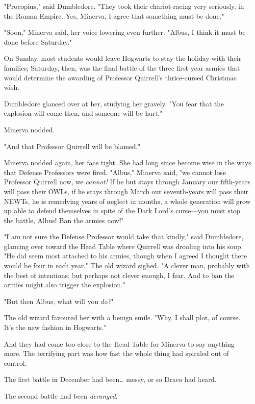 "Procopius," said Dumbledore. "They took their chariot-racing very seriously,
in the Roman Empire. Yes, Minerva, I agree that something must be done."

"Soon," Minerva said, her voice lowering even further. "Albus, I think it must
be done before Saturday."

On Sunday, most students would leave Hogwarts to stay the holiday with their
families; Saturday, then, was the final battle of the three first-year armies
that would determine the awarding of Professor Quirrell's thrice-cursed
Christmas wish.

Dumbledore glanced over at her, studying her gravely. "You fear that the
explosion will come then, and someone will be hurt."

Minerva nodded.

"And that Professor Quirrell will be blamed."

Minerva nodded again, her face tight. She had long since become wise in the
ways that Defense Professors were fired. "Albus," Minerva said, "we cannot lose
Professor Quirrell now, we \emph{cannot!} If he but stays through January our
fifth-years will pass their OWLs, if he stays through March our seventh-years
will pass their NEWTs, he is remedying years of neglect in months, a whole
generation will grow up able to defend themselves in spite of the Dark Lord's
curse---you must stop the battle, Albus! Ban the armies now!"

"I am not sure the Defense Professor would take that kindly," said Dumbledore,
glancing over toward the Head Table where Quirrell was drooling into his soup.
"He did seem most attached to his armies, though when I agreed I thought there
would be four in each year." The old wizard sighed. "A clever man, probably
with the best of intentions; but perhaps not clever enough, I fear. And to ban
the armies might also trigger the explosion."

"But then Albus, what will you \emph{do?}"

The old wizard favoured her with a benign smile. "Why, I shall plot, of course.
It's the new fashion in Hogwarts."

And they had come too close to the Head Table for Minerva to say anything more.
\later
The terrifying part was how fast the whole thing had spiraled out of control.

The first battle in December had been{\ldots} messy, or so Draco had heard.

The second battle had been \emph{deranged}.

